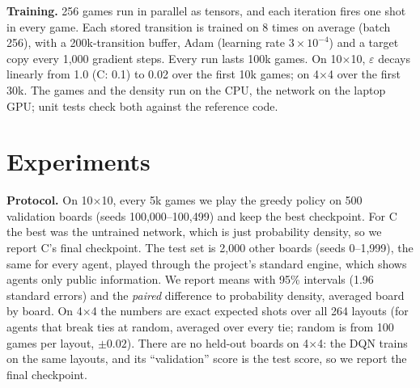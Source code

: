 \documentclass[conference,10pt]{IEEEtran}
\begin{document}
\textbf{Training.} 256 games run in parallel as tensors, and each iteration fires
one shot in every game. Each stored transition is trained on 8 times on average
(batch 256), with a 200k-transition buffer, Adam (learning rate
$3\times10^{-4}$) and a target copy every 1{,}000 gradient steps. Every run lasts
100k games. On 10$\times$10, $\varepsilon$ decays linearly from 1.0 (C: 0.1) to
0.02 over the first 10k games; on 4$\times$4 over the first 30k. The games and the
density run on the CPU, the network on the laptop GPU; unit tests check both
against the reference code.

\section{Experiments}
\textbf{Protocol.} On 10$\times$10, every 5k games we play the greedy policy on
500 validation boards (seeds 100{,}000--100{,}499) and keep the best checkpoint.
For C the best was the untrained network, which is just probability density, so
we report C's final checkpoint. The test set is 2{,}000 other boards (seeds
0--1{,}999), the same for every agent, played through the project's standard
engine, which shows agents only public information. We report means with 95\%
intervals (1.96 standard errors) and the \emph{paired} difference to probability
density, averaged board by board. On 4$\times$4 the numbers are exact expected
shots over all 264 layouts (for agents that break ties at random, averaged over
every tie; random is from 100 games per layout, $\pm0.02$). There are no held-out boards on 4$\times$4: the DQN trains on the
same layouts, and its ``validation'' score is the test score, so we report the
final checkpoint.
\end{document}
